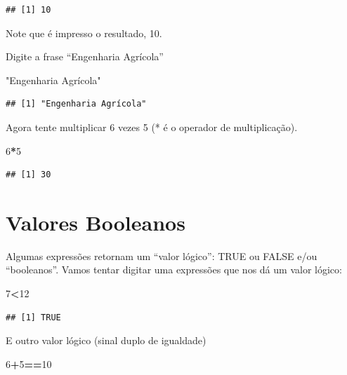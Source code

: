 \documentclass[]{book}
\newenvironment{Shaded}{\begin{snugshade}}{\end{snugshade}}
\newcommand{\DecValTok}[1]{\textcolor[rgb]{0.00,0.00,0.81}{#1}}
\newcommand{\OperatorTok}[1]{\textcolor[rgb]{0.81,0.36,0.00}{\textbf{#1}}}
\newcommand{\StringTok}[1]{\textcolor[rgb]{0.31,0.60,0.02}{#1}}
\begin{document}
\begin{verbatim}
## [1] 10
\end{verbatim}

Note que é impresso o resultado, 10.

Digite a frase ``Engenharia Agrícola''

\begin{Shaded}
\begin{Highlighting}[]
\StringTok{"Engenharia Agrícola"}
\end{Highlighting}
\end{Shaded}

\begin{verbatim}
## [1] "Engenharia Agrícola"
\end{verbatim}

Agora tente multiplicar 6 vezes 5 (* é o operador de multiplicação).

\begin{Shaded}
\begin{Highlighting}[]
\DecValTok{6}\OperatorTok{*}\DecValTok{5}
\end{Highlighting}
\end{Shaded}

\begin{verbatim}
## [1] 30
\end{verbatim}

\hypertarget{valores-booleanos}{%
\section{Valores Booleanos}\label{valores-booleanos}}

Algumas expressões retornam um ``valor lógico'': TRUE ou FALSE e/ou ``booleanos''.
Vamos tentar digitar uma expressões que nos dá um valor lógico:

\begin{Shaded}
\begin{Highlighting}[]
\DecValTok{7}\OperatorTok{<}\DecValTok{12}
\end{Highlighting}
\end{Shaded}

\begin{verbatim}
## [1] TRUE
\end{verbatim}

E outro valor lógico (sinal duplo de igualdade)

\begin{Shaded}
\begin{Highlighting}[]
\DecValTok{6}\OperatorTok{+}\DecValTok{5}\OperatorTok{==}\DecValTok{10}
\end{Highlighting}
\end{Shaded}
\end{document}
